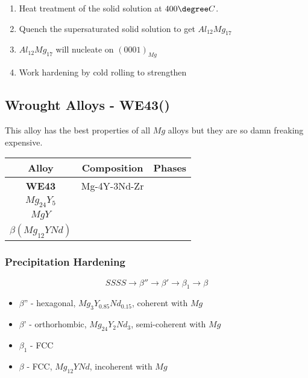 \begin{enumerate}
  \item Heat treatment of the solid solution at $400\degree C$.
  \item Quench the supersaturated solid solution to get $Al_{12}Mg_{17}$
  \item $Al_{12}Mg_{17}$ will nucleate on  $(0001)_{Mg}$
  \item Work hardening by cold rolling to strengthen
\end{enumerate}

\subsection{Wrought Alloys - WE43()} %
\label{sub:we_alloys_}
This alloy has the best properties of all $Mg$ alloys but they are so damn freaking expensive.

\begin{table}[H]
\centering
{\renewcommand{\arraystretch}{2}
\begin{tabular}{|c|c|c|}
\hline
\textbf{Alloy} & \textbf{Composition} & \textbf{Phases} \\ \hline
\textbf{WE43}   & Mg-4Y-3Nd-Zr   & \pbox{20cm}{$Mg_{41}Nd_5$\\ $Mg_{24}Y_5$ \\ $MgY$ \\ $\beta (Mg_{12}YNd)$} \\ \hline
\end{tabular}}
\end{table}

\subsubsection{Precipitation Hardening} %
\label{ssub:precipitation_hardening}

\begin{equation}
  SSSS \rightarrow \beta'' \rightarrow \beta' \rightarrow \beta_1 \rightarrow \beta
\end{equation}

\begin{itemize}
  \item $\beta$'' - hexagonal, $Mg_3Y_{0.85}Nd_{0.15}$, coherent with $Mg$
  \item $\beta$' - orthorhombic, $Mg_{24}Y_{2}Nd_{3}$, semi-coherent with $Mg$
  \item $\beta_1$ - FCC
  \item $\beta$ - FCC, $Mg_{12}YNd$, incoherent with $Mg$
\end{itemize}

